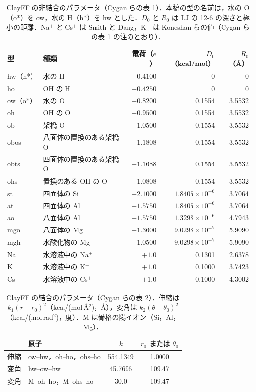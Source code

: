 \documentclass[a4paper,11pt]{article}
\begin{document}
\begin{table}[!htbp]
\centering
\caption{ClayFF の非結合のパラメータ（Cygan ら\cite{cygan2004}の表 1）．本稿の型の名前は，水の O（o*）を ow，水の H（h*）を hw とした．$D_0$ と $R_0$ は LJ の 12-6 の深さと極小の距離．Na$^+$ と Cs$^+$ は Smith と Dang\cite{smithdang}，K$^+$ は Koneshan ら\cite{koneshan1998}の値（Cygan ら\cite{cygan2004}の表 1 の注のとおり）．}
\label{tab:ffparam}
\small
\begin{tabular}{llrrr}
\toprule
型 & 種類 & 電荷（$e$） & $D_0$（kcal/mol） & $R_0$（\AA） \\
\midrule
hw（h*） & 水の H & $+0.4100$ & 0 & 0 \\
ho & OH の H & $+0.4250$ & 0 & 0 \\
ow（o*） & 水の O & $-0.8200$ & 0.1554 & 3.5532 \\
oh & OH の O & $-0.9500$ & 0.1554 & 3.5532 \\
ob & 架橋 O & $-1.0500$ & 0.1554 & 3.5532 \\
obos & 八面体の置換のある架橋 O & $-1.1808$ & 0.1554 & 3.5532 \\
obts & 四面体の置換のある架橋 O & $-1.1688$ & 0.1554 & 3.5532 \\
ohs & 置換のある OH の O & $-1.0808$ & 0.1554 & 3.5532 \\
st & 四面体の Si & $+2.1000$ & $1.8405\times10^{-6}$ & 3.7064 \\
at & 四面体の Al & $+1.5750$ & $1.8405\times10^{-6}$ & 3.7064 \\
ao & 八面体の Al & $+1.5750$ & $1.3298\times10^{-6}$ & 4.7943 \\
mgo & 八面体の Mg & $+1.3600$ & $9.0298\times10^{-7}$ & 5.9090 \\
mgh & 水酸化物の Mg & $+1.0500$ & $9.0298\times10^{-7}$ & 5.9090 \\
Na & 水溶液中の Na$^+$ & $+1.0$ & 0.1301 & 2.6378 \\
K & 水溶液中の K$^+$ & $+1.0$ & 0.1000 & 3.7423 \\
Cs & 水溶液中の Cs$^+$ & $+1.0$ & 0.1000 & 4.3002 \\
\bottomrule
\end{tabular}
\end{table}

\begin{table}[!htbp]
\centering
\caption{ClayFF の結合のパラメータ（Cygan ら\cite{cygan2004}の表 2）．伸縮は $k_1(r-r_0)^2$（kcal/(mol\,\AA$^2$)，\AA），変角は $k_2(\theta-\theta_0)^2$（kcal/(mol\,rad$^2$)，度）．M は骨格の陽イオン（Si，Al，Mg）．}
\label{tab:ffbond}
\small
\begin{tabular}{llcc}
\toprule
 & 原子 & $k$ & $r_0$ または $\theta_0$ \\
\midrule
伸縮 & ow--hw，oh--ho，ohs--ho & 554.1349 & 1.0000 \\
変角 & hw--ow--hw & 45.7696 & 109.47 \\
変角 & M--oh--ho，M--ohs--ho & 30.0 & 109.47 \\
\bottomrule
\end{tabular}
\end{table}
\end{document}
